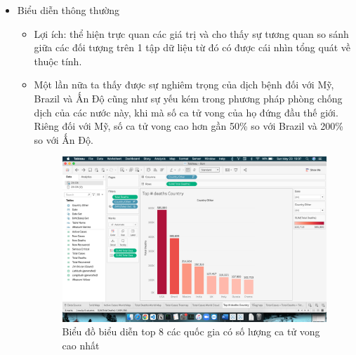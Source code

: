 \documentclass[a4paper, 12pt]{article}
\begin{document}
\begin{itemize}
    \item Biểu diễn thông thường
    \begin{itemize}
        \item Lợi ích: thể hiện trực quan các giá trị và cho thấy sự tương quan so sánh giữa các đối tượng trên 1 tập dữ liệu từ đó có được cái nhìn tổng quát về thuộc tính.
        \item Một lần nữa ta thấy được sự nghiêm trọng của dịch bệnh đối với Mỹ, Brazil và Ấn Độ cũng như sự yếu kém trong phương pháp phòng chống dịch của các nước này, khi mà số ca tử vong của họ đứng đầu thế giới. Riêng đối với Mỹ, số ca tử vong cao hơn gần 50\% so với Brazil và 200\% so với Ấn Độ.
        \begin{figure}[H]
            \begin{center}
                \includegraphics[scale=0.4]{img/barChartTotalDeaths.png}
                \caption{Biểu đồ biểu diễn top 8 các quốc gia có số lượng ca tử vong cao nhất}
            \end{center}
        \end{figure}
    \end{itemize}


\end{itemize}
\end{document}
